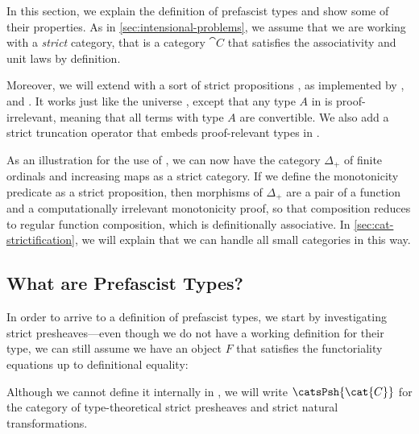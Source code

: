In this section, we explain the definition of prefascist types and show some of 
their properties.
% 
As in \cref{sec:intensional-problems}, we assume that we are working with a 
\emph{strict} category, that is a category \( \cat{C} \) that satisfies the 
associativity and unit laws by definition. 

Moreover, we will extend \MLTT with a sort of strict propositions ,
as implemented by \Coq, \Agda and \Lean {}.
% 
It works just like the universe , except that any type \( A \) 
in  is proof-irrelevant, meaning that all terms with type 
\( A \) are convertible.
% 
We also add a strict truncation operator  that embeds 
proof-relevant types in .

As an illustration for the use of , we can now have the category 
\( \Delta_+ \) of finite ordinals and increasing maps as a strict category.
If we define the monotonicity predicate as a strict proposition, then 
morphisms of \( \Delta_+ \) are a pair of a function and a computationally
irrelevant monotonicity proof, so that composition reduces to regular function 
composition, which is definitionally associative.
% 
In \cref{sec:cat-strictification}, we will explain that we can handle all small
categories in this way.

\subsection{What are Prefascist Types?}

In order to arrive to a definition of prefascist types, we start by 
investigating strict presheaves---even though we do not have a working 
definition for their type, we can still assume we have an object \( F \)
that satisfies the functoriality equations up to definitional equality:


Although we cannot define it internally in \MLTT, we will write 
\( \catsPsh{\cat{C}} \) for the category of type-theoretical strict presheaves
and strict natural transformations.

